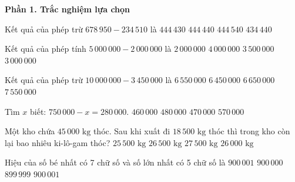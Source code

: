 \textbf{Phần 1. Trắc nghiệm lựa chọn}

\begin{ex} %
Kết quả của phép trừ $678\,950 - 234\,510$ là
\choice
{$444\,430$}
{\True $444\,440$}
{$444\,540$}
{$434\,440$}
\end{ex}

\begin{ex} %
Kết quả của phép tính $5\,000\,000 - 2\,000\,000$ là
\choice
{$2\,000\,000$}
{$4\,000\,000$}
{$3\,500\,000$}
{\True $3\,000\,000$}
\end{ex}

\begin{ex} %
Kết quả của phép trừ $10\,000\,000 - 3\,450\,000$ là
\choice
{\True $6\,550\,000$}
{$6\,450\,000$}
{$6\,650\,000$}
{$7\,550\,000$}
\end{ex}

\begin{ex} %
Tìm $x$ biết: $750\,000 - x = 280\,000$.
\choice
{$460\,000$}
{$480\,000$}
{\True $470\,000$}
{$570\,000$}
\end{ex}

\begin{ex} %
Một kho chứa $45\,000\text{ kg}$ thóc. Sau khi xuất đi $18\,500\text{ kg}$ thóc thì trong kho còn lại bao nhiêu ki-lô-gam thóc?
\choice
{$25\,500\text{ kg}$}
{\True $26\,500\text{ kg}$}
{$27\,500\text{ kg}$}
{$26\,000\text{ kg}$}
\end{ex}

\begin{ex} %
Hiệu của số bé nhất có 7 chữ số và số lớn nhất có 5 chữ số là
\choice
{$900\,001$}
{$900\,000$}
{$899\,999$}
{\True $900\,001$}
\end{ex}

